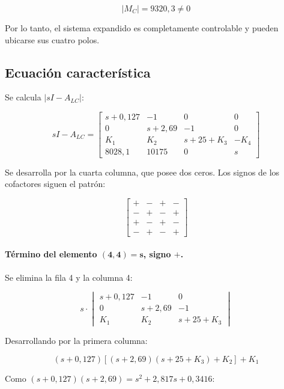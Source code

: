 \documentclass[12pt,a4paper]{article}
\begin{document}
\begin{equation}\boxed{|M_C|=9320{,}3\neq0}\end{equation}

Por lo tanto, el sistema expandido es completamente controlable y pueden ubicarse sus cuatro polos.
\subsection*{Ecuación característica}
Se calcula $|sI-A_{LC}|$:

\begin{equation}sI-A_{LC}=\begin{bmatrix}s+0{,}127&-1&0&0\\0&s+2{,}69&-1&0\\K_1&K_2&s+25+K_3&-K_4\\8028{,}1&10175&0&s\end{bmatrix}\end{equation}

Se desarrolla por la cuarta columna, que posee dos ceros. Los signos de los cofactores siguen el patrón:

\begin{equation}\begin{bmatrix}+&-&+&-\\-&+&-&+\\+&-&+&-\\-&+&-&+\end{bmatrix}\end{equation}
\paragraph{Término del elemento $\boldsymbol{(4,4)=s}$, signo $+$.} Se elimina la fila 4 y la columna 4:

\begin{equation}s\cdot\begin{vmatrix}s+0{,}127&-1&0\\0&s+2{,}69&-1\\K_1&K_2&s+25+K_3\end{vmatrix}\end{equation}

Desarrollando por la primera columna:

\begin{equation}(s+0{,}127)\left[(s+2{,}69)(s+25+K_3)+K_2\right]+K_1\end{equation}

Como $(s+0{,}127)(s+2{,}69)=s^2+2{,}817s+0{,}3416$:
\end{document}

